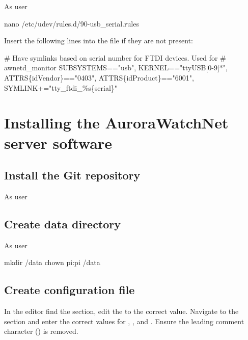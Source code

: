 As user \rootUser
\begin{Cmd}
nano /etc/udev/rules.d/90-usb_serial.rules
\end{Cmd}

Insert the following lines into the file if they are not present:
\begin{Cmd}[fontsize=\relsize{-3}]
# Have symlinks based on serial number for FTDI devices. Used for 
# awnetd_monitor
SUBSYSTEMS=="usb", KERNEL=="ttyUSB[0-9]*", ATTRS\{idVendor\}=="0403", ATTRS\{idProduct\}=="6001", SYMLINK+="tty_ftdi_\%s\{serial\}"  
\end{Cmd}

\section{Installing the AuroraWatchNet server software}

\subsection{Install the Git repository}
As user \piUser



\subsection{Create data directory}
As user \rootUser
\begin{Cmd}
mkdir /data
chown pi:pi /data
\end{Cmd}

\subsection{Create configuration file}

\ifdef{\caluniumMagManual}{%
}{}
\ifdef{\raspiMagManual}{%
}{}
\ifdef{\bgsMagManual}{%
}{}
\ifdef{\riometerManual}{%
}{}

In the editor find the \code{[DEFAULT]} section, edit the 
to the correct value. Navigate to the \code{[upload]} section and
enter the correct values for , ,
 and . Ensure the leading comment character
(\code{\#}) is removed. 


